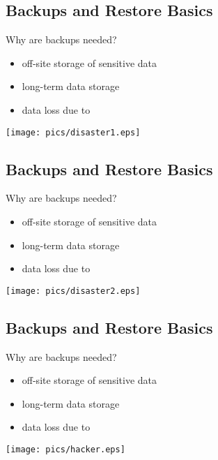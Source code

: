 \documentclass[xga]{xdvislides}
\begin{document}
\subsection{Backups and Restore Basics}
Why are backups needed?
\begin{itemize}
	\item off-site storage of sensitive data
	\item long-term data storage
	\item data loss due to
\end{itemize}
\vspace*{\fill}
\begin{center}
	\texttt{[image: pics/disaster1.eps]}
\end{center}
\vspace*{\fill}

\subsection{Backups and Restore Basics}
Why are backups needed?
\begin{itemize}
	\item off-site storage of sensitive data
	\item long-term data storage
	\item data loss due to
\end{itemize}
\vspace*{\fill}
\begin{center}
	\texttt{[image: pics/disaster2.eps]}
\end{center}
\vspace*{\fill}

\subsection{Backups and Restore Basics}
Why are backups needed?
\begin{itemize}
	\item off-site storage of sensitive data
	\item long-term data storage
	\item data loss due to
\end{itemize}
\vspace*{\fill}
\begin{center}
	\texttt{[image: pics/hacker.eps]}
\end{center}
\vspace*{\fill}
\end{document}
